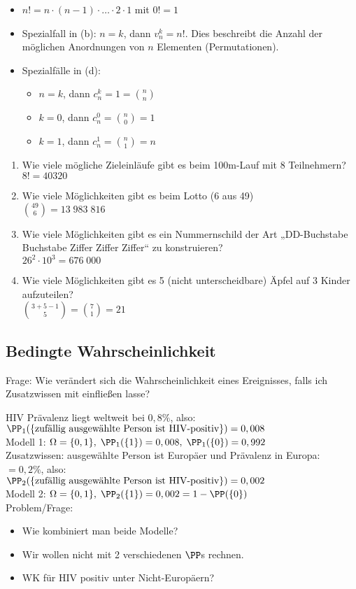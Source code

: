 \documentclass{scrreprt}
\renewenvironment{anumerate}{\begin{enumerate}[label=(\alph*)]}{\end{enumerate}} %
\begin{document}
\begin{itemize}
\item $n!=n\cdot (n-1) \cdot \dots \cdot 2\cdot 1$ mit $0!=1$
\item Spezialfall in (b): $n=k$, dann $v_n^k=n!$. Dies beschreibt die Anzahl der möglichen Anordnungen von $n$ Elementen (Permutationen).
\item Spezialfälle in (d): 
\begin{itemize}
\item $n=k$, dann $c_n^k=1=\binom{n}{n}$
\item $k=0$, dann $c_n^0=\binom{n}{0}=1$
\item $k=1$, dann $c_n^1=\binom{n}{1}=n$
\end{itemize}
\end{itemize}

\begin{anumerate}
\item Wie viele mögliche Zieleinläufe gibt es beim 100m-Lauf mit 8 Teilnehmern?\\
$8!=40320$
\item Wie viele Möglichkeiten gibt es beim Lotto (6 aus 49)\\
$\binom{49}{6}=13\;983\;816$
\item Wie viele Möglichkeiten gibt es ein Nummernschild der Art „DD-Buchstabe Buchstabe Ziffer Ziffer Ziffer“ zu konstruieren?\\
$26^2\cdot 10^3=676 \; 000$
\item Wie viele Möglichkeiten gibt es 5 (nicht unterscheidbare) Äpfel auf 3 Kinder aufzuteilen?\\
$\binom{3+5-1}{5}=\binom{7}{1}=21$
\end{anumerate}

\subsection{Bedingte Wahrscheinlichkeit}
Frage: Wie verändert sich die Wahrscheinlichkeit eines Ereignisses, falls ich Zusatzwissen mit einfließen lasse? 

 HIV Prävalenz liegt weltweit bei $0,8\%$, also:\\
$\PP_1 (\{\text{zufällig ausgewählte Person ist HIV-positiv\}})=0,008$\\
Modell 1: $\Omega =\{0,1\},\; \PP_1 ( \{1\}) = 0,008, \; \PP_1(\{0\})=0,992$\\
Zusatzwissen: ausgewählte Person ist Europäer und Prävalenz in Europa: $=0,2\%$, also:\\
$\PP_2 (\{\text{zufällig ausgewählte Person ist HIV-positiv\}})=0,002$\\
Modell 2: $\Omega = \{0,1\}, \; \PP_2(\{1\})=0,002=1-\PP(\{0\})$\\
Problem/Frage:
\begin{itemize}
\item Wie kombiniert man beide Modelle?
\item Wir wollen nicht mit 2 verschiedenen $\PP$s rechnen.
\item WK für HIV positiv unter Nicht-Europäern?
\end{itemize}
\end{document}
